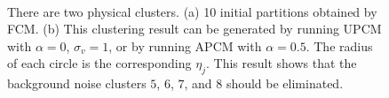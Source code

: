 \documentclass[conference]{IEEEtran}
\theoremstyle{definition}
\begin{document}
\begin{figure}[tb]
\captionsetup[subfloat]{farskip=1pt,captionskip=1pt}%
   \centering
    \\
\caption{There are two physical clusters. (a) 10 initial partitions obtained by FCM. (b) This clustering result can be generated by running UPCM with $\alpha=0$, $\sigma_v=1$, or by running APCM with $\alpha=0.5$. The radius of each circle is the corresponding $\eta_j$. This result shows that the background noise clusters $5$, $6$, $7$, and $8$ should be eliminated.}
\label{fig_background_noise}
\end{figure}
\end{document}
